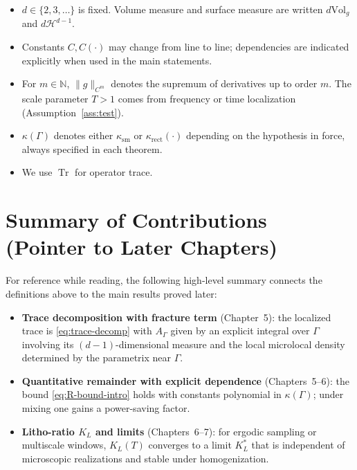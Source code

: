 \begin{itemize}
  \item $d\in\{2,3,\dots\}$ is fixed. Volume measure and surface measure are
  written $d\mathrm{Vol}_g$ and $d\mathcal{H}^{d-1}$.

  \item Constants $C, C(\cdot)$ may change from line to line; dependencies are
  indicated explicitly when used in the main statements.

  \item For $m\in\mathbb{N}$, $\|g\|_{C^m}$ denotes the supremum of derivatives
  up to order $m$. The scale parameter $T>1$ comes from frequency or time
  localization (Assumption~\ref{ass:test}).

  \item $\kappa(\Gamma)$ denotes either $\kappa_{\mathrm{sm}}$ or
  $\kappa_{\mathrm{rect}}(\cdot)$ depending on the hypothesis in force, always
  specified in each theorem.

  \item We use $\operatorname{Tr}$ for operator trace.
\end{itemize}

\section{Summary of Contributions (Pointer to Later Chapters)}
\label{sec:intro-summary}

For reference while reading, the following high-level summary connects the
definitions above to the main results proved later:

\begin{itemize}
  \item \textbf{Trace decomposition with fracture term} (Chapter~5):
  the localized trace is
  \eqref{eq:trace-decomp} with $A_{\Gamma}$ given by an explicit integral over
  $\Gamma$ involving its $(d-1)$-dimensional measure and the local microlocal
  density determined by the parametrix near $\Gamma$.

  \item \textbf{Quantitative remainder with explicit dependence}
  (Chapters~5–6): the bound \eqref{eq:R-bound-intro} holds with constants
  polynomial in $\kappa(\Gamma)$; under mixing one gains a power-saving factor.

  \item \textbf{Litho-ratio $K_L$ and limits} (Chapters~6–7): for ergodic
  sampling or multiscale windows, $K_L(T)$ converges to a limit $K_L^*$ that is
  independent of microscopic realizations and stable under homogenization.
\end{itemize}

